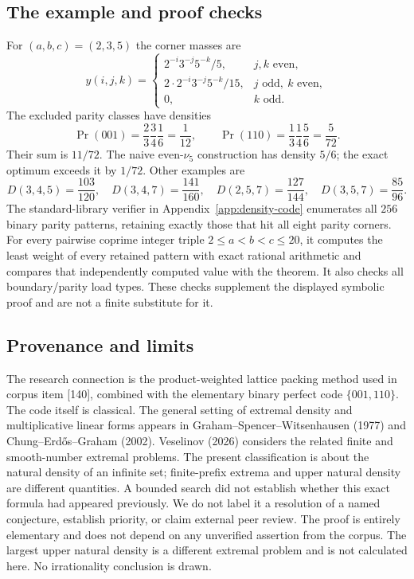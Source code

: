\documentclass[11pt,a4paper]{article}
\theoremstyle{remark}\newtheorem{remark}[theorem]{Remark}
\numberwithin{equation}{section}
\begin{document}
\subsection{The example and proof checks}
For $(a,b,c)=(2,3,5)$ the corner masses are
\[
y(i,j,k)=
\begin{cases}
2^{-i}3^{-j}5^{-k}/5,&j,k\text{ even},\\
2\cdot2^{-i}3^{-j}5^{-k}/15,&j\text{ odd},\ k\text{ even},\\
0,&k\text{ odd}.
\end{cases}
\]
The excluded parity classes have densities
\[
\Pr(001)=\frac23\frac34\frac16=\frac1{12},\qquad
\Pr(110)=\frac13\frac14\frac56=\frac5{72}.
\]
Their sum is $11/72$.
The naive even-$\nu_5$ construction has density $5/6$; the exact
optimum exceeds it by $1/72$. Other examples are
\[
D(3,4,5)=\frac{103}{120},\quad
D(3,4,7)=\frac{141}{160},\quad
D(2,5,7)=\frac{127}{144},\quad
D(3,5,7)=\frac{85}{96}.
\]
The standard-library verifier in Appendix~\ref{app:density-code} enumerates all $256$
binary parity patterns, retaining exactly those that hit all eight
parity corners. For every pairwise coprime integer triple
$2\le a<b<c\le20$, it computes the least weight of every retained
pattern with exact rational arithmetic and compares that independently
computed value with the theorem. It also checks all boundary/parity
load types. These checks supplement the displayed symbolic proof
and are not a finite substitute for it.

\subsection{Provenance and limits}
The research connection is the product-weighted lattice packing
method used in corpus item [140], combined with the elementary
binary perfect code $\{001,110\}$. The code itself is classical.
The general setting of extremal density and multiplicative linear
forms appears in Graham--Spencer--Witsenhausen (1977) and
Chung--Erd\H{o}s--Graham (2002). Veselinov (2026) considers the related
finite and smooth-number extremal problems. The present classification
is about the natural density of an infinite set; finite-prefix extrema
and upper natural density are different quantities. A bounded search
did not establish whether this exact formula had appeared previously.
We do not label it a resolution of a named conjecture, establish priority,
or claim external peer review. The proof is entirely elementary and
does not depend on any unverified assertion from the corpus.
The largest upper natural density is a different extremal problem and
is not calculated here. No irrationality conclusion is drawn.
\end{document}
